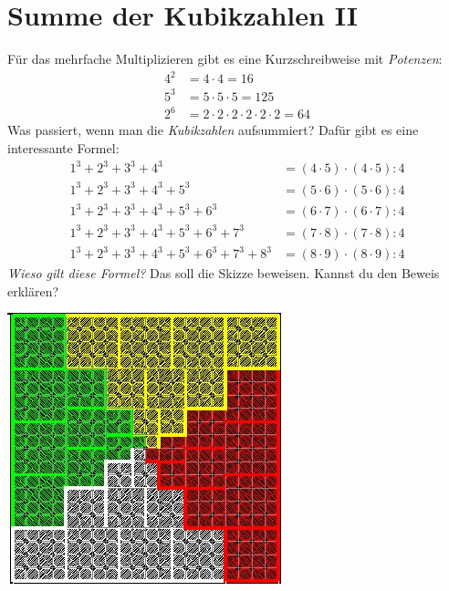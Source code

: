 \documentclass{../zirkelblatt}
\begin{document}
\section*{Summe der Kubikzahlen II}
Für das mehrfache Multiplizieren gibt es eine Kurzschreibweise mit \emph{Potenzen}:
\begin{align*}
  4^2 &= 4 \cdot 4 = 16 \\
  5^3 &= 5 \cdot 5 \cdot 5 = 125 \\
  2^6 &= 2 \cdot 2 \cdot 2 \cdot 2 \cdot 2 \cdot 2 = 64
\end{align*}
Was passiert, wenn man die \emph{Kubikzahlen} aufsummiert? Dafür gibt es
eine interessante Formel:
\begin{align*}
  1^3 + 2^3 + 3^3 + 4^3 \phantom{{} + 5^3 + 6^3 + 7^3 + 8^3} &= (4 \cdot 5) \cdot (4 \cdot 5) : 4 \\
  1^3 + 2^3 + 3^3 + 4^3 + 5^3 \phantom{{} + 6^3 + 7^3 + 8^3} &= (5 \cdot 6) \cdot (5 \cdot 6) : 4 \\
  1^3 + 2^3 + 3^3 + 4^3 + 5^3 + 6^3 \phantom{{} + 7^3 + 8^3} &= (6 \cdot 7) \cdot (6 \cdot 7) : 4 \\
  1^3 + 2^3 + 3^3 + 4^3 + 5^3 + 6^3 + 7^3 \phantom{{} + 8^3} &= (7 \cdot 8) \cdot (7 \cdot 8) : 4 \\
  1^3 + 2^3 + 3^3 + 4^3 + 5^3 + 6^3 + 7^3 + 8^3 &= (8 \cdot 9) \cdot (8 \cdot 9) : 4
\end{align*}
\emph{Wieso gilt diese Formel?} Das soll die Skizze beweisen. Kannst du den
Beweis erklären?
\begin{center}
\includegraphics[scale=0.7]{kubikzahlen-2}
\end{center}
\end{document}
